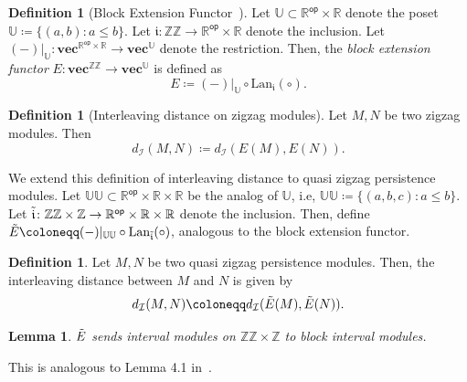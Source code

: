 \documentclass{article}
\newcommand{\qzzmod}{quasi zigzag persistence module}
\newcommand{\RR}{\mathbb{R}}
\newcommand{\zz}{\mathbb{ZZ}}
\newcommand{\z}{\mathbb{Z}}
\newcommand{\ropr}{\RR^{\mathsf{op}} \times \RR}
\newcommand{\uu}{\mathbb{U}}
\newcommand{\uuu}{\mathbb{UU}}
\theoremstyle{plain}
\newtheorem{lemma}[theorem]{Lemma}
\theoremstyle{definition}
\newtheorem{definition}[theorem]{Definition}
\theoremstyle{remark}
\newcommand{\Shreyas}[1]		{{ \textcolor{orange} {S: #1}}}
\begin{document}
\begin{definition}[Block Extension Functor~\cite{zz_stability}]
    Let $\uu \subset \ropr$ denote the poset $\mathbb{U} \coloneqq \{(a,b) \colon a \leq b\}$. Let $\mathfrak{i} \colon \zz \to \RR^{\mathsf{op}} \times \RR$ denote the inclusion. Let $(-)|_\uu \colon \mathbf{vec}^{\ropr} \to \mathbf{vec}^{\uu}$ denote the restriction. Then, the \emph{block extension functor} $E \colon \mathbf{vec}^{\zz} \to \mathbf{vec}^\uu$ is defined as 
    \begin{equation*}
        E \coloneqq (-)|_\uu \circ \text{Lan}_\mathfrak{i}(\circ).
    \end{equation*}
\end{definition}


\begin{definition}[Interleaving distance on zigzag modules]
    Let $M,N$ be two zigzag modules. Then
    \begin{equation*}
        d_\mathcal{I}(M,N) \coloneqq d_\mathcal{I}(E(M), E(N)).
    \end{equation*}
\end{definition}


We extend this definition of interleaving distance to \qzzmod s.  Let $\uuu \subset \ropr \times \RR$ be the analog of $\uu$, i.e, $\uuu \coloneqq \{ (a,b,c) \colon a\leq b \}$. Let $\Tilde{\mathfrak{i}} \colon \zz \times \z \to \ropr \times \RR$ denote the inclusion. Then, define $\Tilde{E} \coloneqq (-)|_\uuu \circ \text{Lan}_{\Tilde{\mathfrak{i}}}(\circ)$, analogous to the block extension functor.

\begin{definition}
    Let $M, N$ be two \qzzmod s. Then, the interleaving distance between $M$ and $N$ is given by 
    \begin{equation*}
        d_\mathcal{I}(M,N) \coloneqq d_\mathcal{I}(\Tilde{E}(M), \Tilde{E}(N)).
    \end{equation*}
\end{definition}

\begin{lemma}\label{alem:interval}
    $\Tilde{E}$ sends interval modules on $\zz \times \z$ to block interval modules.
\end{lemma}
This is analogous to Lemma 4.1 in~\cite{zz_stability}.

\end{document}
